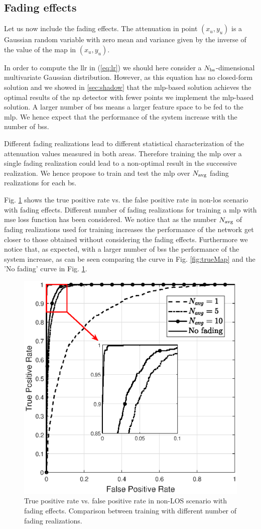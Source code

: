 \documentclass[draftcls,onecolumn,12pt]{IEEEtran}
\begin{document}
\subsection{Fading effects}
Let us now include the fading effects. The attenuation in point $(x_u,y_u)$ is a Gaussian random variable with zero mean and variance given by the inverse of the value of the map in $(x_u,y_u)$.


In order to compute the \ac{llr} in (\ref{eq:lr}) we should here consider a $N_{\rm bs}$-dimensional multivariate Gaussian distribution. However, as this equation has no closed-form solution and we showed in \ref{sec:shadow} that the \ac{mlp}-based solution achieves the optimal results of the \ac{np} detector with fewer points we implement the \ac{mlp}-based solution. A larger number of \acp{bs} means a larger feature space to be fed to the \ac{mlp}. We hence expect that the performance of the system increase with the number of \acp{bs}.

Different fading realizations lead to different statistical characterization of the attenuation values measured in both areas. Therefore training the \ac{mlp} over a single fading realization could lead to a non-optimal result in the successive realization. We hence propose to train and test the \ac{mlp} over $N_{\rm avg}$ fading realizations for each \ac{bs}.

Fig. \ref{fig:faded} shows the true positive rate vs. the false positive rate in non-\ac{los} scenario with fading effects. Different number of fading realizations for training a \ac{mlp} with \ac{mse} loss function has been considered. We notice that as the number $N_{\rm avg}$ of fading realizations used for training increases the performance of the network get closer to those obtained without considering the fading effects. Furthermore we notice that, as expected, with a larger number of \acp{bs} the performance of the system increase, as can be seen comparing the curve in Fig. \ref{fig:trueMap} and the 'No fading' curve in Fig. \ref{fig:faded}.

\begin{figure}
    \centering
    \includegraphics[width=0.5\columnwidth]{Navg.eps}
    \caption{True positive rate vs. false positive rate in non-LOS scenario with fading effects. Comparison between training with different number of fading realizations.}
    \label{fig:faded}
\end{figure}
\newpage 




%
%
\end{document}

